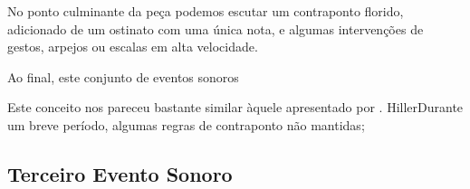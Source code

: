 No ponto culminante da peça podemos escutar um contraponto florido, adicionado de um ostinato com uma única nota, e algumas intervenções de gestos, arpejos ou escalas em alta velocidade.

Ao final, este conjunto de eventos sonoros

Este conceito nos pareceu bastante similar àquele apresentado por . HillerDurante um breve período, algumas regras de contraponto não mantidas;

\subsection{Terceiro Evento Sonoro}\label{sec:terceiro evento}